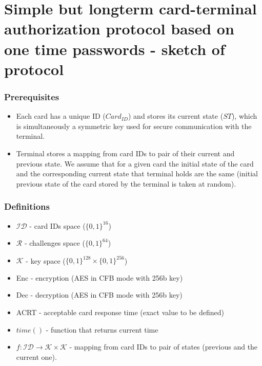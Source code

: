 \documentclass[10pt,titlepage]{article}
\begin{document}
\section*{Simple but longterm card-terminal authorization protocol based on one time passwords - sketch of protocol}

\subsubsection*{Prerequisites}

\begin{itemize}
	\item  Each card has a unique ID ($Card_{ID}$) and stores its current state ($ST$), which is simultaneously a symmetric key used for secure communication with the terminal.
	\item Terminal stores a mapping from card IDs to pair of their current and previous state. We assume that for a given card the initial state of the card and the corresponding current state that terminal holds are the same (initial previous state of the card stored by the terminal is taken at random).
\end{itemize}

\subsubsection*{Definitions}

\begin{itemize}
	\item $\mathcal{ID}$  - card IDs space ($\{0,1\}^{16}$)
	\item $\mathcal{R}$   - challenges space ($\{0,1\}^{64}$)
	\item $\mathcal{K}$   - key space ($\{0,1\}^{128} \times \{0,1\}^{256}$)
	\item Enc - encryption (AES in CFB mode with 256b key)
	\item Dec - decryption (AES in CFB mode with 256b key)
	\item ACRT - acceptable card response time (exact value to be defined)
	\item $time()$ - function that returns current time
	\item $f : \mathcal{ID} \rightarrow \mathcal{K} \times \mathcal{K}$ - mapping from card IDs to pair of states (previous and the current one).
\end{itemize}

\newpage
\end{document}
